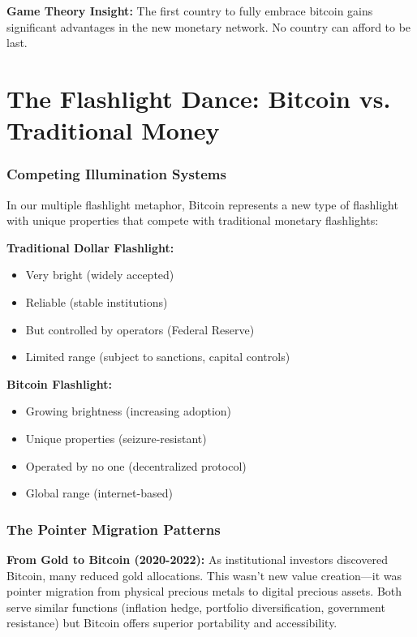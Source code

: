 \documentclass[11pt,oneside]{book}
\begin{document}
\textbf{Game Theory Insight:} The first country to fully embrace bitcoin gains significant advantages in the new monetary network. No country can afford to be last.

\section{The Flashlight Dance: Bitcoin vs. Traditional Money}

\subsubsection{Competing Illumination Systems}

In our multiple flashlight metaphor, Bitcoin represents a new type of flashlight with unique properties that compete with traditional monetary flashlights:

\textbf{Traditional Dollar Flashlight:}
\begin{itemize}
\item Very bright (widely accepted)
\item Reliable (stable institutions)
\item But controlled by operators (Federal Reserve)
\item Limited range (subject to sanctions, capital controls)
\end{itemize}

\textbf{Bitcoin Flashlight:}
\begin{itemize}
\item Growing brightness (increasing adoption)
\item Unique properties (seizure-resistant)
\item Operated by no one (decentralized protocol)
\item Global range (internet-based)
\end{itemize}

\subsubsection{The Pointer Migration Patterns}

\textbf{From Gold to Bitcoin (2020-2022):}
As institutional investors discovered Bitcoin, many reduced gold allocations. This wasn't new value creation—it was pointer migration from physical precious metals to digital precious assets. Both serve similar functions (inflation hedge, portfolio diversification, government resistance) but Bitcoin offers superior portability and accessibility.
\end{document}
